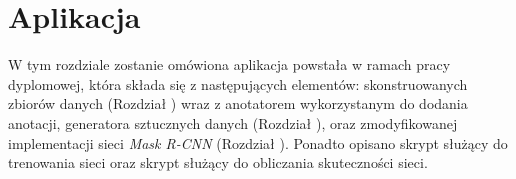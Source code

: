 \chapter{Aplikacja}
\label{sec:aplikacja}
W tym rozdziale zostanie omówiona aplikacja powstała w ramach pracy dyplomowej, która składa się z następujących elementów: skonstruowanych zbiorów danych (Rozdział ) wraz z anotatorem wykorzystanym do dodania anotacji, generatora sztucznych danych (Rozdział ), oraz zmodyfikowanej implementacji sieci \textit{Mask R-CNN} (Rozdział ).
Ponadto opisano skrypt służący do trenowania sieci oraz skrypt służący do obliczania skuteczności sieci.

